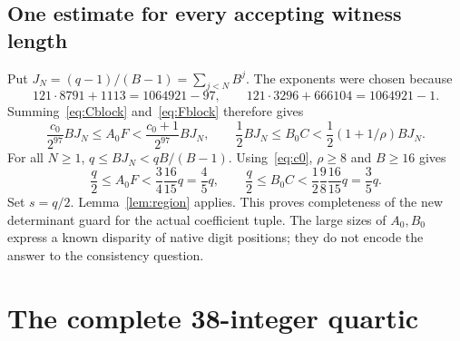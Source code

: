 \documentclass[11pt]{article}
\theoremstyle{definition}\newtheorem{definition}[theorem]{Definition}
\theoremstyle{remark}\newtheorem{remark}[theorem]{Remark}
\begin{document}
\subsection{One estimate for every accepting witness length}

Put $J_N=(q-1)/(B-1)=\sum_{j<N}B^j$. The exponents were chosen because
\[
 121\cdot8791+1113=1064921-97,\qquad
 121\cdot3296+666104=1064921-1.
\]
Summing~\eqref{eq:Cblock} and~\eqref{eq:Fblock} therefore gives
\[
 \frac{c_0}{2^{97}}BJ_N\le A_0F<\frac{c_0+1}{2^{97}}BJ_N,
 \qquad
 \frac12BJ_N\le B_0C<\frac12(1+1/\rho)BJ_N.
\]
For all $N\ge1$,
$q\le BJ_N<qB/(B-1)$. Using~\eqref{eq:c0}, $\rho\ge8$ and $B\ge16$ gives
\[
 \frac q2\le A_0F<\frac34\frac{16}{15}q=\frac45q,
 \qquad
 \frac q2\le B_0C<\frac12\frac98\frac{16}{15}q=\frac35q.
\]
Set $s=q/2$. Lemma~\ref{lem:region} applies. This proves completeness
of the new determinant guard for the actual coefficient tuple. The large
sizes of $A_0,B_0$ express a known disparity of native digit positions; they
do not encode the answer to the consistency question.

\section{The complete 38-integer quartic}
\label{sec:quartic}
\end{document}
